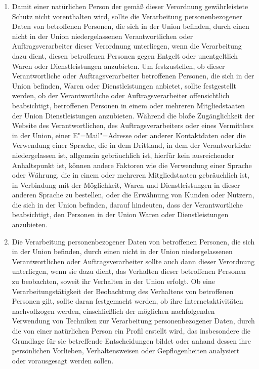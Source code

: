 \begin{enumerate}
   \item Damit einer natürlichen Person der gemäß dieser Verordnung gewährleistete Schutz nicht vorenthalten wird,
    sollte die Verarbeitung personenbezogener Daten von betroffenen Personen, die sich in der Union befinden, durch
    einen nicht in der Union niedergelassenen Verantwortlichen oder Auftragsverarbeiter dieser Verordnung unterliegen,
    wenn die Verarbeitung dazu dient, diesen betroffenen Personen gegen Entgelt oder unentgeltlich Waren oder
    Dienstleistungen anzubieten. Um festzustellen, ob dieser Verantwortliche oder Auftragsverarbeiter betroffenen
    Personen, die sich in der Union befinden, Waren oder Dienstleistungen anbietet, sollte festgestellt werden, ob der
    Verantwortliche oder Auftragsverarbeiter offensichtlich beabsichtigt, betroffenen Personen in einem oder mehreren
    Mitgliedstaaten der Union Dienstleistungen anzubieten. Während die bloße Zugänglichkeit der Website des
    Verantwortlichen, des Auftragsverarbeiters oder eines Vermittlers in der Union, einer E"=Mail"=Adresse oder anderer
    Kontaktdaten oder die Verwendung einer Sprache, die in dem Drittland, in dem der Verantwortliche niedergelassen
    ist, allgemein gebräuchlich ist, hierfür kein ausreichender Anhaltspunkt ist, können andere Faktoren wie die
    Verwendung einer Sprache oder Währung, die in einem oder mehreren Mitgliedstaaten gebräuchlich ist, in Verbindung
    mit der Möglichkeit, Waren und Dienstleistungen in dieser anderen Sprache zu bestellen, oder die Erwähnung von
    Kunden oder Nutzern, die sich in der Union befinden, darauf hindeuten, dass der Verantwortliche beabsichtigt, den
    Personen in der Union Waren oder Dienstleistungen anzubieten.%
   \label{eg:23}
   

   \item Die Verarbeitung personenbezogener Daten von betroffenen Personen, die sich in der Union befinden, durch einen
    nicht in der Union niedergelassenen Verantwortlichen oder Auftragsverarbeiter sollte auch dann dieser Verordnung
    unterliegen, wenn sie dazu dient, das Verhalten dieser betroffenen Personen zu beobachten, soweit ihr Verhalten in
    der Union erfolgt. Ob eine Verarbeitungstätigkeit der Beobachtung des Verhaltens von betroffenen Personen gilt,
    sollte daran festgemacht werden, ob ihre Internetaktivitäten nachvollzogen werden, einschließlich der möglichen
    nachfolgenden Verwendung von Techniken zur Verarbeitung personenbezogener Daten, durch die von einer natürlichen
    Person ein Profil erstellt wird, das insbesondere die Grundlage für sie betreffende Entscheidungen bildet oder
    anhand dessen ihre persönlichen Vorlieben, Verhaltensweisen oder Gepflogenheiten analysiert oder vorausgesagt
    werden sollen.%
   \label{eg:24}
   

\end{enumerate}
